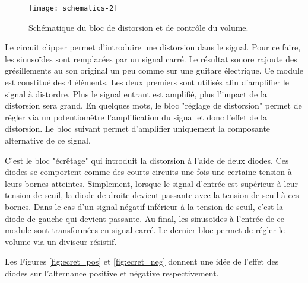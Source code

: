 \begin{figure}[!ht]
	\centering
	\texttt{[image: schematics-2]}
	\caption{Schématique du bloc de distorsion et de contrôle du volume.}
	\label{fig3:clipper}
\end{figure}

Le circuit clipper permet d'introduire une distorsion dans le signal. Pour ce faire, les sinusoïdes sont remplacées par un signal carré. Le résultat sonore rajoute des grésillements au son original un peu comme sur une guitare électrique. Ce module est constitué des 4 éléments.  Les deux premiers sont utilisés afin d'amplifier le signal à distordre. Plus le signal entrant est amplifié, plus l'impact de la distorsion sera grand. En quelques mots, le bloc "réglage de distorsion" permet de régler via un potentiomètre l'amplification du signal et donc l'effet de la distorsion. Le bloc suivant permet d'amplifier uniquement la composante alternative de ce signal.

C'est le bloc "écrêtage" qui introduit la distorsion à l'aide de deux diodes. Ces diodes se comportent comme des courts circuits une fois une certaine tension à leurs bornes atteintes. Simplement, lorsque le signal d'entrée est supérieur à leur tension de seuil, la diode de droite devient passante avec la tension de seuil à ces bornes. Dans le cas d'un signal négatif inférieur à la tension de seuil, c'est la diode de gauche qui devient passante. Au final, les sinusoïdes à l'entrée de ce module sont transformées en signal carré. Le dernier bloc permet de régler le volume via un diviseur résistif.

Les Figures \ref{fig:ecret_pos} et \ref{fig:ecret_neg} donnent une idée de l'effet des diodes sur l'alternance positive et négative respectivement.

